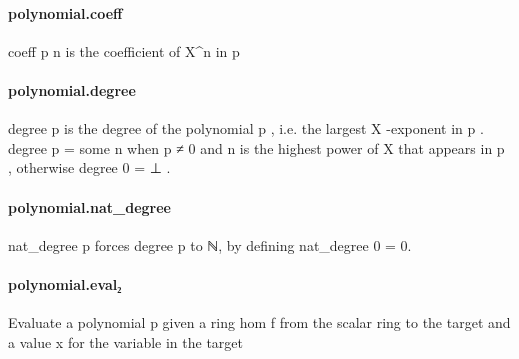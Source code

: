 \documentclass{article}
\begin{document}
\paragraph{polynomial.coeff}
\par
coeff p n is the coefficient of X\textasciicircum{}n in p
\paragraph{polynomial.degree}
\par
\colorbox[RGB]{253,246,227}{{{{\color[RGB]{101, 123, 131} degree p }}}} is the degree of the polynomial 
\colorbox[RGB]{253,246,227}{{{{\color[RGB]{101, 123, 131} p }}}}, i.e. the largest 
\colorbox[RGB]{253,246,227}{{{{\color[RGB]{101, 123, 131} X }}}}-exponent in 
\colorbox[RGB]{253,246,227}{{{{\color[RGB]{101, 123, 131} p }}}}.
\colorbox[RGB]{253,246,227}{{{{\color[RGB]{101, 123, 131} degree p  }}}{{{\color[RGB]{181, 137, 0} = }}}{{{\color[RGB]{101, 123, 131}  some n }}}} when 
\colorbox[RGB]{253,246,227}{{{{\color[RGB]{101, 123, 131} p  }}}{{{\color[RGB]{181, 137, 0} ≠ }}}{{{\color[RGB]{101, 123, 131}   }}}{{{\color[RGB]{108, 113, 196} 0 }}}} and 
\colorbox[RGB]{253,246,227}{{{{\color[RGB]{101, 123, 131} n }}}} is the highest power of 
\colorbox[RGB]{253,246,227}{{{{\color[RGB]{101, 123, 131} X }}}} that appears in 
\colorbox[RGB]{253,246,227}{{{{\color[RGB]{101, 123, 131} p }}}}, otherwise
\colorbox[RGB]{253,246,227}{{{{\color[RGB]{101, 123, 131} degree  }}}{{{\color[RGB]{108, 113, 196} 0 }}}{{{\color[RGB]{101, 123, 131}   }}}{{{\color[RGB]{181, 137, 0} = }}}{{{\color[RGB]{101, 123, 131}  ⊥ }}}}.
\paragraph{polynomial.nat\_degree}
\par
\colorbox[RGB]{253,246,227}{{{{\color[RGB]{101, 123, 131} nat\_degree p }}}} forces 
\colorbox[RGB]{253,246,227}{{{{\color[RGB]{101, 123, 131} degree p }}}} to ℕ, by defining nat\_degree 0 = 0.
\paragraph{polynomial.eval₂}
\par
Evaluate a polynomial 
\colorbox[RGB]{253,246,227}{{{{\color[RGB]{101, 123, 131} p }}}} given a ring hom 
\colorbox[RGB]{253,246,227}{{{{\color[RGB]{101, 123, 131} f }}}} from the scalar ring
to the target and a value 
\colorbox[RGB]{253,246,227}{{{{\color[RGB]{101, 123, 131} x }}}} for the variable in the target
\end{document}
